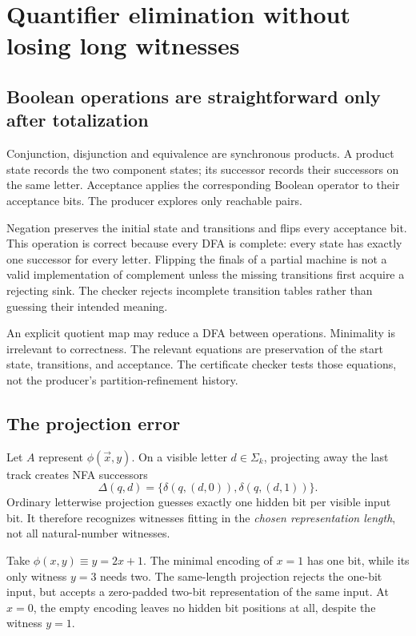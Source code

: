\section{Quantifier elimination without losing long witnesses}\label{sec:projection}

\subsection{Boolean operations are straightforward only after totalization}
Conjunction, disjunction and equivalence are synchronous products. A product state records the two component states; its successor records their successors on the same letter. Acceptance applies the corresponding Boolean operator to their acceptance bits. The producer explores only reachable pairs.

Negation preserves the initial state and transitions and flips every acceptance bit. This operation is correct because every DFA is complete: every state has exactly one successor for every letter. Flipping the finals of a partial machine is not a valid implementation of complement unless the missing transitions first acquire a rejecting sink. The checker rejects incomplete transition tables rather than guessing their intended meaning.

An explicit quotient map may reduce a DFA between operations. Minimality is irrelevant to correctness. The relevant equations are preservation of the start state, transitions, and acceptance. The certificate checker tests those equations, not the producer's partition-refinement history.

\subsection{The projection error}
Let \(A\) represent \(\phi(\vec x,y)\). On a visible letter \(d\in\Sigma_k\), projecting away the last track creates NFA successors
\[
 \Delta(q,d)=\{\delta(q,(d,0)),\delta(q,(d,1))\}.
\]
Ordinary letterwise projection guesses exactly one hidden bit per visible input bit. It therefore recognizes witnesses fitting in the \emph{chosen representation length}, not all natural-number witnesses.

Take \(\phi(x,y)\equiv y=2x+1\). The minimal encoding of \(x=1\) has one bit, while its only witness \(y=3\) needs two. The same-length projection rejects the one-bit input, but accepts a zero-padded two-bit representation of the same input. At \(x=0\), the empty encoding leaves no hidden bit positions at all, despite the witness \(y=1\).

